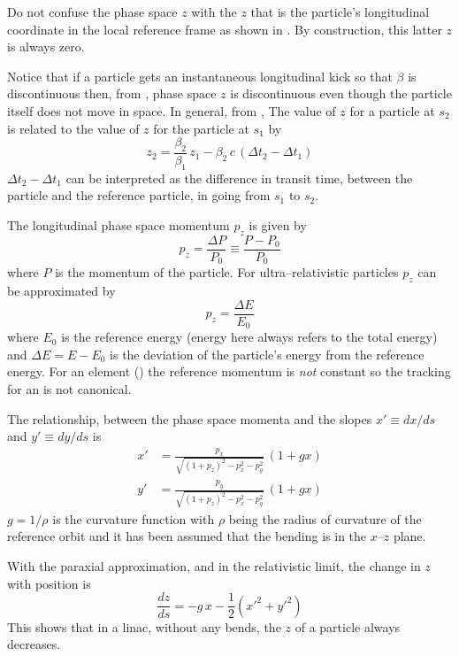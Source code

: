 Do not confuse the phase space $z$ with the $z$ that is the particle's longitudinal coordinate in
the local reference frame as shown in . By construction, this latter $z$ is
always zero.

Notice that if a particle gets an instantaneous longitudinal kick so that $\beta$ is discontinuous
then, from , phase space $z$ is discontinuous even though the particle itself does not
move in space. In general, from , The value of $z$ for a particle at $s_2$ is related to
the value of $z$ for the particle at $s_1$ by
\begin{equation}
  z_2 = \frac{\beta_2}{\beta_1} \, z_1 - 
  \beta_2 \, c \, (\Delta t_2 - \Delta t_1)
  \label{zbbzb}
\end{equation}
$\Delta t_2 - \Delta t_1$ can be interpreted as the difference in transit time, between the particle
and the reference particle, in going from $s_1$ to $s_2$.

The longitudinal phase space momentum $p_z$ is given by
\begin{equation}
  p_z = \frac{\Delta P}{P_0} \equiv \frac{P - P_0}{P_0}
  \label{ppppp}
\end{equation}
where $P$ is the momentum of the particle. For ultra--relativistic particles $p_z$ can be
approximated by
\begin{equation}
  p_z = \frac{\Delta E}{E_0}
\end{equation}
where $E_0$ is the reference energy (energy here always refers to the total energy) and $\Delta E =
E - E_0$ is the deviation of the particle's energy from the reference energy. For an 
element () the reference momentum is {\it not} constant so the tracking for an
 is not canonical.

The relationship, between the phase space momenta and the slopes $x' \equiv dx/ds$ and $y' \equiv dy/ds$
is
\begin{align}
  x' &= \frac{p_x}{\sqrt{(1 + p_z)^2 - p_x^2 - p_y^2}} \, (1 + g x) \\
  y' &= \frac{p_y}{\sqrt{(1 + p_z)^2 - p_x^2 - p_y^2}} \, (1 + g x) 
  \label{xpa1p}
\end{align}
$g = 1/\rho$ is the curvature function with $\rho$ being the radius of curvature of the reference
orbit and it has been assumed that the bending is in the $x$--$z$ plane.

With the paraxial approximation, and in the relativistic limit, the change in $z$ with position is
\begin{equation}
  \frac{dz}{ds} = -g \, x - \frac{1}{2} (x'^2 + y'^2)
\end{equation}
This shows that in a linac, without any bends, the $z$ of a particle always decreases.


